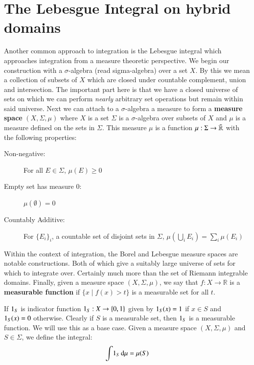 \section{The Lebesgue Integral on hybrid domains}

Another common approach to integration is the Lebesgue integral which approaches integration from a measure theoretic
perspective.
We begin our construction with a $\sigma$-algebra (read sigma-algebra) over a set $X$.
By this we mean a collection of subsets of $X$ which are closed under countable complement, union and intersection.
The important part here is that we have a closed universe of sets on which we can perform 
\emph{nearly} arbitrary set operations but remain within said universe.
Next we can attach to a $\sigma$-algebra a measure to form a \textbf{measure space} $(X, \Sigma, \mu)$ 
where $X$ is a set $\Sigma$ is a $\sigma$-algebra  over subsets of $X$ and $\mu$ is a measure defined on the sets in
 $\Sigma$.
This measure $\mu$ is a function $\mu: \Sigma \to \bar{\mathbb{R}}$ with the following properties:
\begin{description}
	\item[Non-negative:] For all $E \in \Sigma$, $\mu(E) \geq 0$
	\item[Empty set has measure 0:] $\mu(\emptyset) = 0$
	\item[Countably Additive:] For $\{E_i\}_i$, a countable set of disjoint sets in $\Sigma$,
		$\mu \left( \bigcup_i E_i \right) = \sum_i \mu(E_i)$
\end{description}
Within the context of integration, the Borel and Lebesgue measure spaces are notable constructions.
Both of which give a suitably large universe of sets for which to integrate over.
Certainly much more than the set of Riemann integrable domains.
Finally, given a measure space $(X, \Sigma, \mu)$, we say that $f : X \to \mathbb{R}$ is a \textbf{measurable function}
if  $\{ x \; | \; f(x) > t\}$ is a measurable set for all $t$.



If $\ind[S]$ is indicator function $\ind[S] : X \to \{ 0, 1 \}$ given by 
$\ind[S] (x) = 1$ if $x \in S$ and $\ind[S] (x) = 0$ otherwise.
Clearly if $S$ is a measurable set, then $\ind[S]$ is a measurable function.
We will use this as a base case.
Given a measure space $(X, \Sigma, \mu)$ and $S \in \Sigma$, we define the integral:
\begin{equation*}
	\int \! \ind[S] \diff \mu = \mu ( S )
\end{equation*}


